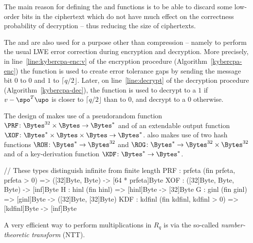 The main reason for defining the \KyberCompress and \KyberDecompress 
functions is to be able to discard some low-order bits in the ciphertext 
which do not have much effect on the correctness probability of decryption -- thus reducing the
size of ciphertexts.

The \KyberCompress and \KyberDecompress are also used for a purpose other than compression -- namely to perform the usual LWE error correction during encryption and decryption. 
More precisely, in line~\ref{line:kybercpa-enc:v} of the encryption procedure 
(Algorithm~\ref{kybercpa-enc}) 
the \KyberDecompress function is used to create error tolerance gaps 
by sending the message bit $0$ to $0$ and $1$ to $\lceil q/2\rfloor$. 
Later, on line~\ref{line:decrypt} of the decryption procedure (Algorithm~\ref{kybercpa-dec}), 
the \KyberCompress function is used to decrypt to a $1$ if $v-\spo^T\upo$ is closer to $\lceil q/2\rfloor$ than to $0$, 
and decrypt to a $0$ otherwise.


The design of \Kyber makes use of 
a pseudorandom function $\PRF\colon\Bytes^{32}\times \Bytes \rightarrow \Bytes^*$
and of an extendable output function $\XOF\colon\Bytes^*\times\Bytes\times\Bytes \rightarrow \Bytes^*$.
\Kyber also makes use of two hash functions $\ROH\colon\Bytes^* \rightarrow \Bytes^{32}$
and $\ROG\colon\Bytes^* \rightarrow \Bytes^{32}\times\Bytes^{32}$ and of
a key-derivation function $\KDF\colon\Bytes^* \rightarrow \Bytes^*$.

\begin{code}
  // These types distinguish infinite from finite length
  PRF : {prfeta} (fin prfeta, prfeta > 0) => ([32]Byte, Byte) -> [64 * prfeta]Byte
  XOF : ([32]Byte, Byte, Byte) -> [inf]Byte
  H : {hinl} (fin hinl) => [hinl]Byte -> [32]Byte
  G : {ginl} (fin ginl) => [ginl]Byte -> ([32]Byte, [32]Byte)
  KDF : {kdfinl} (fin kdfinl, kdfinl > 0) => [kdfinl]Byte -> [inf]Byte
\end{code}

A very efficient way to perform multiplications in $R_q$ is via
the so-called \emph{number-theoretic transform} (NTT).

